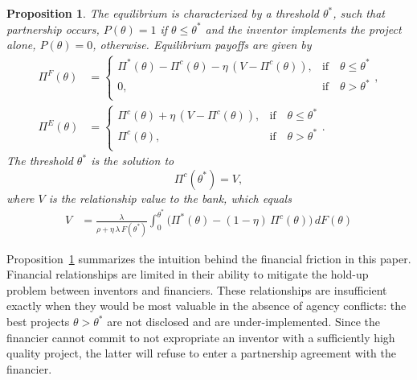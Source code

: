 \documentclass[12pt]{article}
\newtheorem{proposition}[theorem]{Proposition}
\begin{document}
\begin{proposition}\label{prop:char} The equilibrium is characterized by a threshold $\theta^*$, such that partnership occurs, $P(\theta)=1$ if $\theta\leq \theta^*$ and the inventor implements the project alone, $P(\theta)=0$, otherwise. Equilibrium payoffs are given by
\begin{align}
\Pi^F(\theta)& = \left\{\begin{array}{ll}
\Pi^*(\theta)-\Pi^c(\theta) -  \eta\,\left(V-\Pi^c(\theta)\right),& \textrm{if} \quad  \theta\leq \theta^*\\
0, & \textrm{if} \quad  \theta>\theta^*\\
\end{array}    \right.,\\
\Pi^E(\theta)& = \left\{\begin{array}{ll}
 \Pi^c(\theta) + \eta\, \left(V-\Pi^c(\theta)\right),& \textrm{if} \quad  \theta\leq \theta^*\\
\Pi^c(\theta), & \textrm{if} \quad  \theta>\theta^*\\
\end{array}    \right..
\end{align}
The threshold $\theta^*$ is the solution to
\begin{equation}\label{eq:marg}
\Pi^c(\theta^*) = V,
\end{equation}
where $V$ is the relationship value to the bank, which equals
\begin{align}
 V  &=\frac{\lambda} { \rho +  \eta \, \lambda  \, F(\theta^*) } \int_0^{\theta^*} \Big(\Pi^*(\theta)-(1-\eta)\, \Pi^c(\theta)      \Big)\, d F(\theta)
\end{align}
\end{proposition}
Proposition~\ref{prop:char} summarizes the intuition behind the financial friction in this paper. Financial relationships are limited in their ability to mitigate the hold-up problem between inventors and financiers. These relationships are insufficient exactly when they would be most valuable in the absence of agency conflicts: the best projects $\theta>\theta^*$ are not disclosed and are under-implemented. Since the financier cannot commit to not expropriate an inventor with a sufficiently high quality project, the latter will refuse to enter a partnership agreement with the financier.
\end{document}
